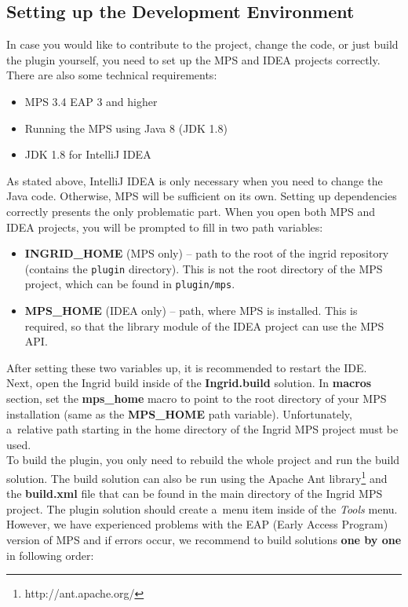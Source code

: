 \subsection{Setting up the Development Environment}
\label{chap:dev_env}

In case you would like to contribute to the project, change the code, or just build the plugin yourself, you need to set up the MPS and IDEA projects correctly.
There are also some technical requirements:

\begin{itemize}
	\item MPS 3.4 EAP 3 and higher
	\item Running the MPS using Java 8 (JDK 1.8)
	\item JDK 1.8 for IntelliJ IDEA
\end{itemize}

As stated above, IntelliJ IDEA is only necessary when you need to change the Java code.
Otherwise, MPS will be sufficient on its own.
Setting up dependencies correctly presents the only problematic part.
When you open both MPS and IDEA projects, you will be prompted to fill in two path variables:

\begin{itemize}
	\item \textbf{INGRID{\_}HOME} (MPS only) -- path to the root of the ingrid repository (contains the \texttt{plugin} directory). This is not the root directory of the MPS project, which can be found in \texttt{plugin/mps}.

	\item \textbf{MPS{\_}HOME} (IDEA only) -- path, where MPS is installed. This is required, so that the library module of the IDEA project can use the MPS API.
\end{itemize}

After setting these two variables up, it is recommended to restart the IDE.
\\

Next, open the Ingrid build inside of the \textbf{Ingrid.build} solution. In \textbf{macros} section, set the \textbf{mps{\_}home} macro to point to the root directory of your MPS installation (same as the \textbf{MPS{\_}HOME} path variable).
Unfortunately, a~relative path starting in the home directory of the Ingrid MPS project must be used.
\\

To build the plugin, you only need to rebuild the whole project and run the build solution.
The build solution can also be run using the Apache Ant library\footnote{http://ant.apache.org/} and the \textbf{build.xml} file that can be found in the main directory of the Ingrid MPS project.
The plugin solution should create a~menu item inside of the \textit{Tools} menu.
However, we have experienced problems with the EAP (Early Access Program) version of MPS and if errors occur, we recommend to build solutions \textbf{one by one} in following order:

